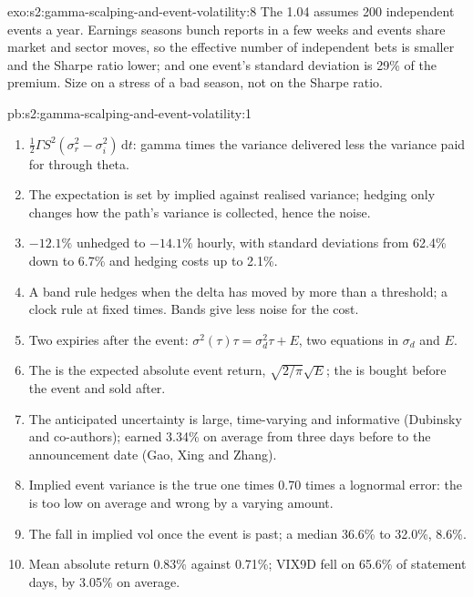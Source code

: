 \begin{solution}{exo:s2:gamma-scalping-and-event-volatility:8}
The 1.04 assumes 200 independent events a year. Earnings seasons bunch reports in a few weeks and events share market and sector moves, so the
effective number of independent bets is smaller and the Sharpe ratio lower; and one event's standard deviation is 29\% of the premium. Size on a
stress of a bad season, not on the Sharpe ratio.
\end{solution}

\begin{solution}{pb:s2:gamma-scalping-and-event-volatility:1}
\begin{enumerate}
\item $\tfrac12\Gamma S^2(\sigma_r^2 - \sigma_i^2)\,\mathrm{d}t$: gamma times the variance delivered less the variance paid for through theta.
\item The expectation is set by implied against realised variance; hedging only changes how the path's variance is collected, hence the noise.
\item $-12.1\%$ unhedged to $-14.1\%$ hourly, with standard deviations from 62.4\% down to 6.7\% and hedging costs up to 2.1\%.
\item A band rule hedges when the delta has moved by more than a threshold; a clock rule at fixed times. Bands give less noise for the cost.
\item Two expiries after the event: $\sigma^2(\tau)\tau = \sigma_d^2\tau + E$, two equations in $\sigma_d$ and $E$.
\item The  is the expected absolute event return, $\sqrt{2/\pi}\sqrt{E}$; the  is bought before the event and sold after.
\item The anticipated uncertainty is large, time-varying and informative (Dubinsky and co-authors);  earned 3.34\% on average from three
days before to the announcement date (Gao, Xing and Zhang).
\item Implied event variance is the true one times 0.70 times a lognormal error: the  is too low on average and wrong by a varying
amount.
\item The fall in implied vol once the event is past; a median 36.6\% to 32.0\%, 8.6\%.
\item Mean absolute return 0.83\% against 0.71\%; VIX9D fell on 65.6\% of statement days, by 3.05\% on average.

\end{enumerate}
\end{solution}
